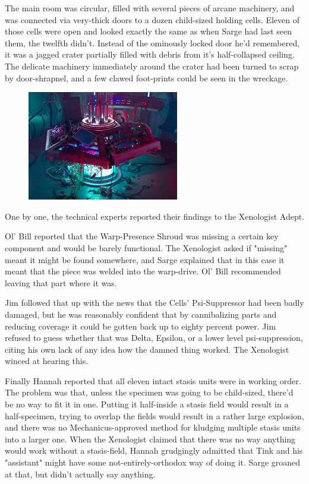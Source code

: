 The main room was circular, filled with several pieces of arcane machinery, and was connected via very-thick doors to a dozen child-sized holding cells. 
Eleven of those cells were open and looked exactly the same as when Sarge had last seen them, the twelfth didn't. 
Instead of the ominously locked door he'd remembered, it was a jagged crater partially filled with debris from it's half-collapsed ceiling. 
The delicate machinery immediately around the crater had been turned to scrap by door-shrapnel, and a few clawed foot-prints could be seen in the wreckage.

\begin{figure}
	\begin{center}
		\includegraphics[width=\figwidth]{pics/12/2.png}
	\end{center}
\end{figure}
One by one, the technical experts reported their findings to the Xenologist Adept. 


Ol' Bill reported that the Warp-Presence Shroud was missing a certain key component and would be barely functional. 
The Xenologist asked if "missing" meant it might be found somewhere, and Sarge explained that in this case it meant that the piece was welded into the warp-drive. 
Ol' Bill recommended leaving that part where it was.

Jim followed that up with the news that the Cells' Psi-Suppressor had been badly damaged, but he was reasonably confident that by cannibalizing parts and reducing coverage it could be gotten back up to eighty percent power. 
Jim refused to guess whether that was Delta, Epsilon, or a lower level psi-suppression, citing his own lack of any idea how the damned thing worked. 
The Xenologist winced at hearing this.

Finally Hannah reported that all eleven intact stasis units were in working order. 
The problem was that, unless the specimen was going to be child-sized, there'd be no way to fit it in one. 
Putting it half-inside a stasis field would result in a half-specimen, trying to overlap the fields would result in a rather large explosion, and there was no Mechanicus-approved method for kludging multiple stasis units into a larger one. 
When the Xenologist claimed that there was no way anything would work without a stasis-field, Hannah grudgingly admitted that Tink and his "assistant" might have some not-entirely-orthodox way of doing it. 
Sarge groaned at that, but didn't actually say anything.

